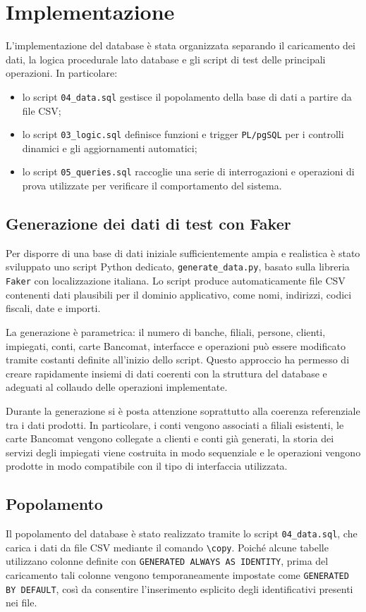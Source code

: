 
\section{Implementazione}
L'implementazione del database è stata organizzata separando il caricamento dei dati, la logica procedurale lato database e gli script di test delle principali operazioni. In particolare:
\begin{itemize}
  \item lo script \texttt{04\_data.sql} gestisce il popolamento della base di dati a partire da file CSV;
  \item lo script \texttt{03\_logic.sql} definisce funzioni e trigger \texttt{PL/pgSQL} per i controlli dinamici e gli aggiornamenti automatici;
  \item lo script \texttt{05\_queries.sql} raccoglie una serie di interrogazioni e operazioni di prova utilizzate per verificare il comportamento del sistema.
\end{itemize}

\subsection{Generazione dei dati di test con Faker}
Per disporre di una base di dati iniziale sufficientemente ampia e realistica è stato sviluppato uno script Python dedicato, \texttt{generate\_data.py}, basato sulla libreria \texttt{Faker} con localizzazione italiana. Lo script produce automaticamente file CSV contenenti dati plausibili per il dominio applicativo, come nomi, indirizzi, codici fiscali, date e importi.

La generazione è parametrica: il numero di banche, filiali, persone, clienti, impiegati, conti, carte Bancomat, interfacce e operazioni può essere modificato tramite costanti definite all'inizio dello script. Questo approccio ha permesso di creare rapidamente insiemi di dati coerenti con la struttura del database e adeguati al collaudo delle operazioni implementate.

Durante la generazione si è posta attenzione soprattutto alla coerenza referenziale tra i dati prodotti. In particolare, i conti vengono associati a filiali esistenti, le carte Bancomat vengono collegate a clienti e conti già generati, la storia dei servizi degli impiegati viene costruita in modo sequenziale e le operazioni vengono prodotte in modo compatibile con il tipo di interfaccia utilizzata.

\subsection{Popolamento}
Il popolamento del database è stato realizzato tramite lo script \texttt{04\_data.sql}, che carica i dati da file CSV mediante il comando \texttt{\textbackslash copy}. Poiché alcune tabelle utilizzano colonne definite con \texttt{GENERATED ALWAYS AS IDENTITY}, prima del caricamento tali colonne vengono temporaneamente impostate come \texttt{GENERATED BY DEFAULT}, così da consentire l'inserimento esplicito degli identificativi presenti nei file.


